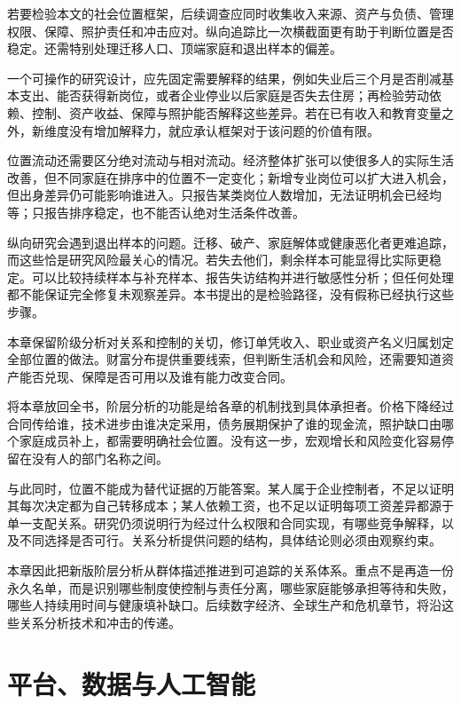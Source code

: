 \documentclass[UTF8,fontset=fandol,zihao=-4,oneside,openany]{ctexbook}
\begin{document}
若要检验本文的社会位置框架，后续调查应同时收集收入来源、资产与负债、管理权限、保障、照护责任和冲击应对。纵向追踪比一次横截面更有助于判断位置是否稳定。还需特别处理迁移人口、顶端家庭和退出样本的偏差。

\label{arg:P179}
一个可操作的研究设计，应先固定需要解释的结果，例如失业后三个月是否削减基本支出、能否获得新岗位，或者企业停业以后家庭是否失去住房；再检验劳动依赖、控制、资产收益、保障与照护能否解释这些差异。若在已有收入和教育变量之外，新维度没有增加解释力，就应承认框架对于该问题的价值有限。

位置流动还需要区分绝对流动与相对流动。经济整体扩张可以使很多人的实际生活改善，但不同家庭在排序中的位置不一定变化；新增专业岗位可以扩大进入机会，但出身差异仍可能影响谁进入。只报告某类岗位人数增加，无法证明机会已经均等；只报告排序稳定，也不能否认绝对生活条件改善。

纵向研究会遇到退出样本的问题。迁移、破产、家庭解体或健康恶化者更难追踪，而这些恰是研究风险最关心的情况。若失去他们，剩余样本可能显得比实际更稳定。可以比较持续样本与补充样本、报告失访结构并进行敏感性分析；但任何处理都不能保证完全修复未观察差异。本书提出的是检验路径，没有假称已经执行这些步骤。

本章保留阶级分析对关系和控制的关切，修订单凭收入、职业或资产名义归属划定全部位置的做法。财富分布提供重要线索，但判断生活机会和风险，还需要知道资产能否兑现、保障是否可用以及谁有能力改变合同。

\label{arg:P180}
将本章放回全书，阶层分析的功能是给各章的机制找到具体承担者。价格下降经过合同传给谁，技术进步由谁决定采用，债务展期保护了谁的现金流，照护缺口由哪个家庭成员补上，都需要明确社会位置。没有这一步，宏观增长和风险变化容易停留在没有人的部门名称之间。

与此同时，位置不能成为替代证据的万能答案。某人属于企业控制者，不足以证明其每次决定都为自己转移成本；某人依赖工资，也不足以证明每项工资差异都源于单一支配关系。研究仍须说明行为经过什么权限和合同实现，有哪些竞争解释，以及不同选择是否可行。关系分析提供问题的结构，具体结论则必须由观察约束。

本章因此把新版阶层分析从群体描述推进到可追踪的关系体系。重点不是再造一份永久名单，而是识别哪些制度使控制与责任分离，哪些家庭能够承担等待和失败，哪些人持续用时间与健康填补缺口。后续数字经济、全球生产和危机章节，将沿这些关系分析技术和冲击的传递。

\chapter{平台、数据与人工智能}
\end{document}
